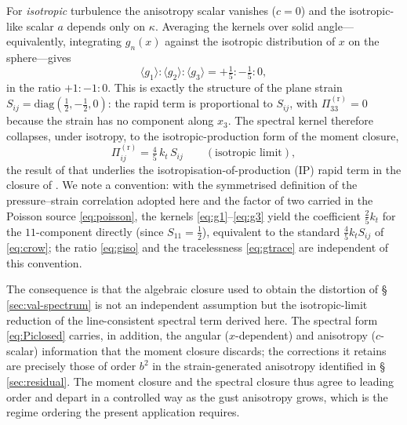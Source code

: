 \documentclass[lineno]{JFM-FLM_Au}
\newcounter{assumption}
\begin{document}
For \emph{isotropic} turbulence the anisotropy scalar vanishes ($c=0$) and the
isotropic-like scalar $a$ depends only on $\kappa$. Averaging the kernels over
solid angle---equivalently, integrating $g_n(x)$ against the isotropic
distribution of $x$ on the sphere---gives
\begin{equation}
  \langle g_1\rangle : \langle g_2\rangle : \langle g_3\rangle
  = +\tfrac15 : -\tfrac15 : 0,
  \label{eq:giso}
\end{equation}
in the ratio $+1:-1:0$. This is exactly the structure of the plane strain
$S_{ij}=\mathrm{diag}(\tfrac12,-\tfrac12,0)$: the rapid term is proportional to
$S_{ij}$, with $\Pi^{(\mathrm r)}_{33}=0$ because the strain has no component
along $x_3$. The spectral kernel therefore collapses, under isotropy, to the
isotropic-production form of the moment closure,
\begin{equation}
  \Pi^{(\mathrm r)}_{ij}
  = \tfrac{4}{5}\,k_t\,S_{ij}
  \qquad(\text{isotropic limit}),
  \label{eq:crow}
\end{equation}
the result of \citet{Crow1968} that underlies the isotropisation-of-production
(IP) rapid term in the closure of \citet{LaunderReeceRodi1975}. We note a
convention: with the symmetrised definition of the pressure--strain correlation
adopted here and the factor of two carried in the Poisson source
\eqref{eq:poisson}, the kernels \eqref{eq:g1}--\eqref{eq:g3} yield the
coefficient $\tfrac25 k_t$ for the $11$-component directly (since $S_{11}=\tfrac12$),
equivalent to the standard $\tfrac45 k_t S_{ij}$ of \eqref{eq:crow}; the ratio
\eqref{eq:giso} and the tracelessness \eqref{eq:gtrace} are independent of this
convention.

The consequence is that the algebraic closure used to obtain the distortion of
\S\,\ref{sec:val-spectrum} is not an independent assumption but the
isotropic-limit reduction of the line-consistent spectral term derived here.
The spectral form \eqref{eq:Piclosed} carries, in addition, the angular
($x$-dependent) and anisotropy ($c$-scalar) information that the moment closure
discards; the corrections it retains are precisely those of order $b^2$ in the
strain-generated anisotropy identified in \S\,\ref{sec:residual}. The moment
closure and the spectral closure thus agree to leading order and depart in a
controlled way as the gust anisotropy grows, which is the regime ordering the
present application requires.
\end{document}
